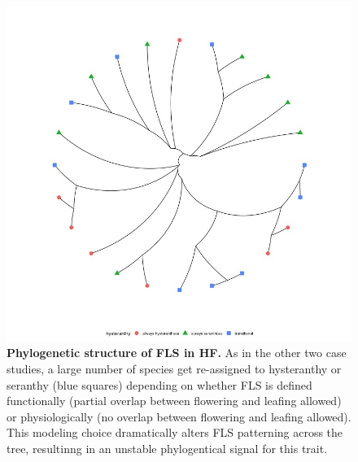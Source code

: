 \documentclass[12pt]{article}\usepackage[]{graphicx}\usepackage[]{color}
\begin{document}
    \begin{figure}
    \centering
    \includegraphics[width=.8\textwidth]{..//figure/HFtreeplot.jpeg}
    \caption{\textbf{Phylogenetic structure of FLS in HF.} As in the other two case studies, a large number of species get re-assigned to hysteranthy or seranthy (blue squares) depending on whether FLS is defined functionally (partial overlap between flowering and leafing allowed) or physiologically (no overlap between flowering and leafing allowed). This modeling choice dramatically alters FLS patterning across the tree, resultinng in an unstable phylogentical signal for this trait.}
    \label{fig:Figure S3}
    \end{figure}
\end{document}
